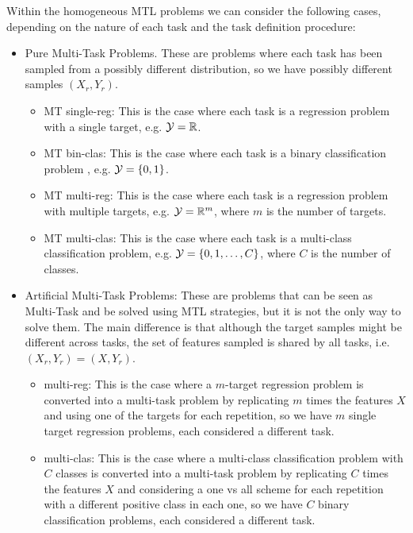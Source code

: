 Within the homogeneous MTL problems we can consider the following cases, depending on the nature of each task and the task definition procedure:
\begin{itemize}
    \item Pure Multi-Task Problems. These are problems where each task has been sampled from a possibly different distribution, so we have possibly different samples $(X_r, Y_r)$.
    \begin{itemize}
        \item MT single-reg: This is the case where each task is a regression problem with a single target, e.g. $\mathcal{Y} = \mathbb{R}$. 
        \item MT bin-clas: This is the case where each task is a binary classification problem , e.g. $\mathcal{Y} = \left\{0, 1\right\}$. 
        \item MT multi-reg: This is the case where each task is a regression problem with multiple targets, e.g. $\mathcal{Y} = \mathbb{R}^m$, where $m$ is the number of targets. 
        \item MT multi-clas: This is the case where each task is a multi-class classification problem, e.g. $\mathcal{Y} = \left\{0, 1, \ldots, C\right\}$, where $C$ is the number of classes.
    \end{itemize}
    \item Artificial Multi-Task Problems: These are problems that can be seen as Multi-Task and be solved using MTL strategies, but it is not the only way to solve them. The main difference is that although the target samples might be different across tasks, the set of features sampled is shared by all tasks, i.e. $(X_r, Y_r) = (X, Y_r)$.
    \begin{itemize}
        \item multi-reg: This is the case where a $m$-target regression problem is converted into a multi-task problem by replicating $m$ times the features $X$ and using one of the targets for each repetition, so we have $m$ single target regression problems, each considered a different task.
        \item multi-clas: This is the case where a multi-class classification problem with $C$ classes is converted into a multi-task problem by replicating $C$ times the features $X$ and considering a one vs all scheme for each repetition with a different positive class in each one, so we have $C$ binary classification problems, each considered a different task.
    \end{itemize}
\end{itemize}

